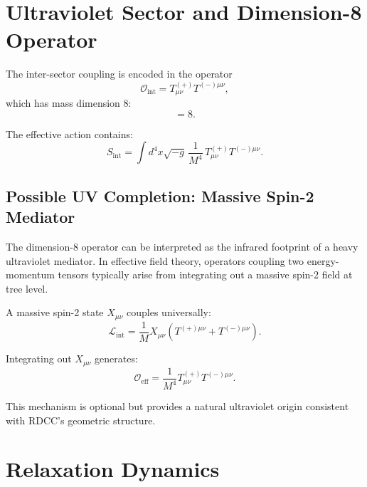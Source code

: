 \documentclass[11pt,a4paper]{article}
\begin{document}
\section{Ultraviolet Sector and Dimension-8 Operator}

The inter-sector coupling is encoded in the operator
\begin{equation}
\mathcal{O}_{\mathrm{int}} = T^{(+)}_{\mu\nu} T^{(-)\mu\nu},
\end{equation}
which has mass dimension 8:
\begin{equation}
[T^{(+)}_{\mu\nu} T^{(-)\mu\nu}] = 8.
\end{equation}

The effective action contains:
\begin{equation}
S_{\mathrm{int}}
=
\int d^4x \sqrt{-g} \,
\frac{1}{M^4} \,
T^{(+)}_{\mu\nu} T^{(-)\mu\nu}.
\end{equation}

\subsection{Possible UV Completion: Massive Spin-2 Mediator}

The dimension-8 operator can be interpreted as the infrared footprint of a
heavy ultraviolet mediator. In effective field theory, operators coupling two
energy-momentum tensors typically arise from integrating out a massive spin-2
field at tree level.

A massive spin-2 state $X_{\mu\nu}$ couples universally:
\begin{equation}
\mathcal{L}_{\mathrm{int}}
=
\frac{1}{M} X_{\mu\nu}
\left(
T^{(+)\mu\nu}
+
T^{(-)\mu\nu}
\right).
\end{equation}

Integrating out $X_{\mu\nu}$ generates:
\begin{equation}
\mathcal{O}_{\mathrm{eff}}
=
\frac{1}{M^4}
T^{(+)}_{\mu\nu} T^{(-)\mu\nu}.
\end{equation}

This mechanism is optional but provides a natural ultraviolet origin consistent
with RDCC’s geometric structure.

\section{Relaxation Dynamics}
\end{document}
